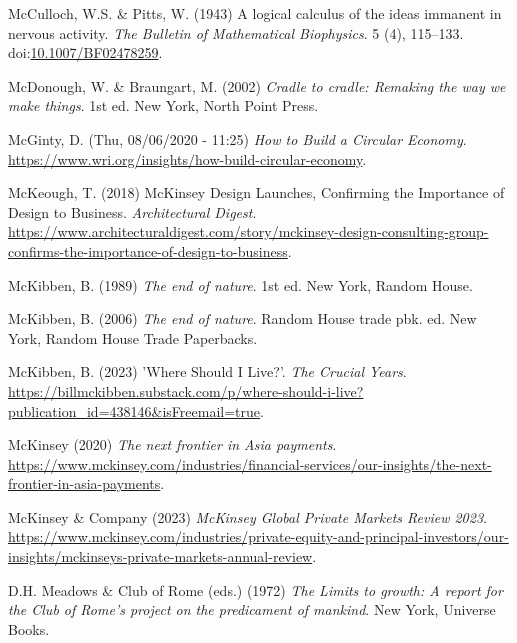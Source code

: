 \documentclass[
  letterpaper,
  DIV=11,
  numbers=noendperiod]{scrartcl}
\newlength{\cslhangindent}
\newenvironment{CSLReferences}[2] %
 {\begin{list}{}{%
  \setlength{\itemindent}{0pt}
  \setlength{\leftmargin}{0pt}
  \setlength{\parsep}{0pt}
  \ifodd #1
   \setlength{\leftmargin}{\cslhangindent}
   \setlength{\itemindent}{-1\cslhangindent}
  \fi
  \setlength{\itemsep}{#2\baselineskip}}}
 {\end{list}}
\begin{document}
\begin{CSLReferences}{0}{1}
McCulloch, W.S. \& Pitts, W. (1943) A logical calculus of the ideas
immanent in nervous activity. \emph{The Bulletin of Mathematical
Biophysics}. 5 (4), 115--133.
doi:\href{https://doi.org/10.1007/BF02478259}{10.1007/BF02478259}.

McDonough, W. \& Braungart, M. (2002) \emph{Cradle to cradle: Remaking
the way we make things}. 1st ed. New York, North Point Press.

McGinty, D. (Thu, 08/06/2020 - 11:25) \emph{How to {Build} a {Circular
Economy}}.
\url{https://www.wri.org/insights/how-build-circular-economy}.

McKeough, T. (2018) {McKinsey Design Launches}, {Confirming} the
{Importance} of {Design} to {Business}. \emph{Architectural Digest}.
\url{https://www.architecturaldigest.com/story/mckinsey-design-consulting-group-confirms-the-importance-of-design-to-business}.

McKibben, B. (1989) \emph{The end of nature}. 1st ed. New York, Random
House.

McKibben, B. (2006) \emph{The end of nature}. Random House trade pbk.
ed. New York, Random House Trade Paperbacks.

McKibben, B. (2023) '{Where Should I Live}?'. \emph{The Crucial Years}.
\url{https://billmckibben.substack.com/p/where-should-i-live?publication_id=438146&isFreemail=true}.

McKinsey (2020) \emph{The next frontier in {Asia} payments}.
\url{https://www.mckinsey.com/industries/financial-services/our-insights/the-next-frontier-in-asia-payments}.

McKinsey \& Company (2023) \emph{{McKinsey Global Private Markets
Review} 2023}.
\url{https://www.mckinsey.com/industries/private-equity-and-principal-investors/our-insights/mckinseys-private-markets-annual-review}.

D.H. Meadows \& Club of Rome (eds.) (1972) \emph{The {Limits} to growth:
A report for the {Club} of {Rome}'s project on the predicament of
mankind}. New York, Universe Books.


\end{CSLReferences}
\end{document}
